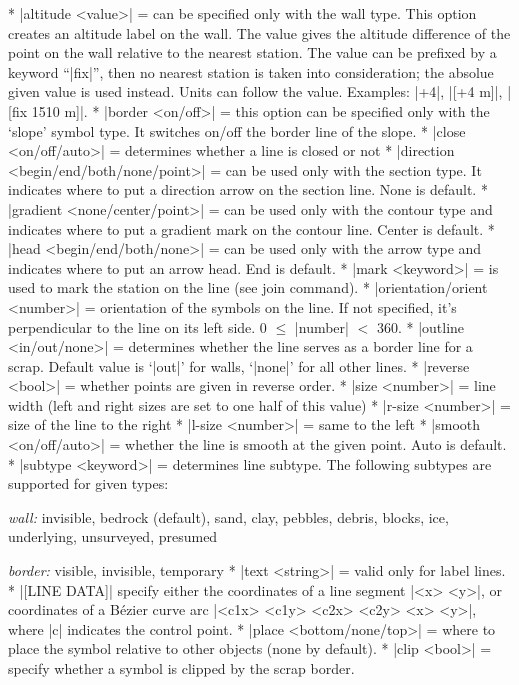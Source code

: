 \comopt
   * |altitude <value>| = can be specified only with the wall type.
         This option creates an altitude label on the wall. The value
         gives the altitude difference of the point on the wall 
         relative to the nearest station. The value can be prefixed
         by a keyword ``|fix|'', then no nearest station is taken into
         consideration; the absolue given value is used instead.
         Units can follow the value. Examples: |+4|, |[+4 m]|,
         |[fix 1510 m]|.
       * |border <on/off>| = this option can be specified only with
         the `slope' symbol type. It switches on/off the border line of the slope.
       * |close <on/off/auto>| = determines whether a line is closed 
         or not
       * |direction <begin/end/both/none/point>| = can be used only
         with the section type. It indicates where to put 
         a direction arrow on the section line. None is default.
       * |gradient <none/center/point>| = can be used only with the contour
         type and indicates where to put a gradient mark on the contour line.
         Center is default.
       * |head <begin/end/both/none>| = can be used only with the arrow
         type and indicates where to put an arrow head. End is default.
       * |mark <keyword>| = is used to mark the station on the line (see
         join command).
       * |orientation/orient <number>| = orientation of the symbols
         on the line. If not specified, it's perpendicular to the 
         line on its left side. 0 $\le$ |number| $<$ 360.
       * |outline <in/out/none>| = determines whether the line serves as
         a border line for a scrap. Default value is `|out|' for
         walls, `|none|' for all other lines.
       * |reverse <bool>| = whether points are given in reverse order.
       * |size <number>| = line width (left and right sizes are set to 
         one half of this value)
       * |r-size <number>| = size of the line to the right
       * |l-size <number>| = same to the left
       * |smooth <on/off/auto>| = whether the line is smooth at the given point.
         Auto is default.
       * |subtype <keyword>| = determines line subtype. The following
         subtypes are supported for given types:  

         {\it wall:} invisible, bedrock (default), sand, clay, pebbles, debris,
         blocks, ice, underlying, unsurveyed, presumed  

         {\it border:} visible, invisible, temporary
       * |text <string>| = valid only for label lines.
       * |[LINE DATA]| specify either the coordinates of a line segment
         |<x> <y>|, or coordinates of a B\'ezier curve arc 
         |<c1x> <c1y> <c2x> <c2y> <x> <y>|, where |c| indicates the control
         point.
       * |place <bottom/none/top>| = where to place the symbol relative
         to other objects (none by default).
       * |clip <bool>| = specify whether a symbol is clipped by the scrap border.
\endcomopt


